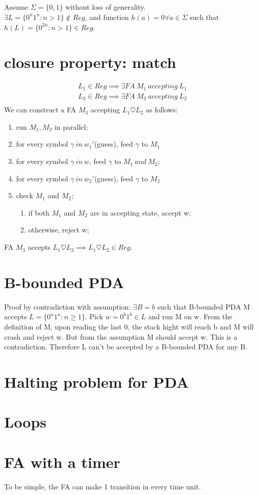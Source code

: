 \documentclass{article}
\begin{document}
\subsection{}

Assume $ \Sigma = \{0, 1\} $ without loss of generality.\\
$ \exists L = \{0^n1^n: n>1\} \notin Reg $, and function $ h(a) = 0 \forall a \in \Sigma $ such that $ h(L) = \{0^{2n}: n>1\} \in Reg $.

\section{closure property: match}

\begin{align*}
L_1 \in Reg \implies \exists FA \ M_1 \ accepting \ L_1\\
L_2 \in Reg \implies \exists FA \ M_2 \ accepting \ L_2\\
\end{align*}
We can construct a FA $ M_3 $ accepting $ L_1 \heartsuit L_2 $ as follows:
\begin{enumerate}
	\item run $ M_1, M_2 $ in parallel;
	\item for every symbol $ \gamma \ in \ w_1' $(guess), feed $ \gamma $ to $ M_1 $
	\item for every symbol $ \gamma \ in \ w $, feed $ \gamma $ to $ M_1 \ and \ M_2 $;
	\item for every symbol $ \gamma \ in \ w_2' $(guess), feed $ \gamma $ to $ M_2 $
	\item check $ M_1 $ and $ M_2 $;
	\begin{enumerate}
		\item if both $ M_1  $ and $ M_2 $ are in accepting state, accept w;
		\item otherwise, reject w;	
	\end{enumerate}
\end{enumerate}
FA $ M_3 $ accepts $ L_1 \heartsuit L_2 \implies L_1 \heartsuit L_2 \in Reg$.

\section{B-bounded PDA}

Proof by contradiction with assumption: $ \exists B = b $ such that B-bounded PDA M accepts $ L = \{0^n1^n: n \geq 1\} $. Pick $ w = 0^b1^b \in L $ and run M on w. From the definition of M, upon reading the last 0, the stack hight will reach b and M will crash and reject w. But from the assumption M should accept w. This is a contradiction. Therefore L can't be accepted by a B-bounded PDA for any B.

\section{Halting problem for PDA}

\section{Loops}

\section{FA with a timer}

To be simple, the FA can make 1 transition in every time unit.
\end{document}
